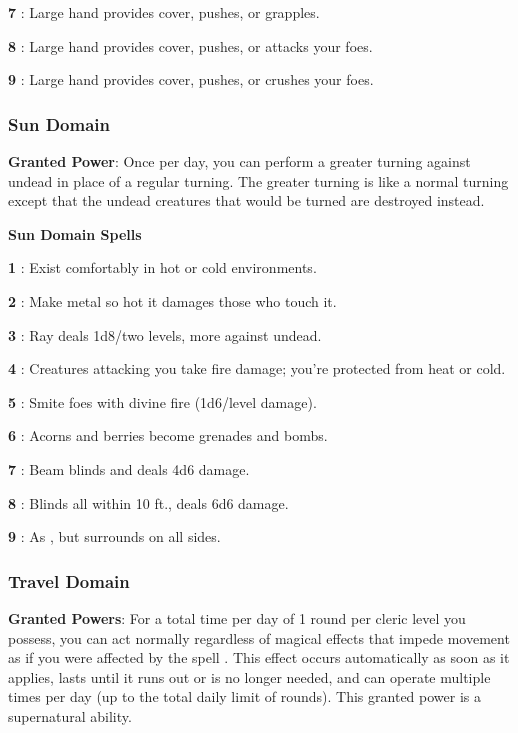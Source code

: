 \textbf{7} : Large hand provides cover, pushes, or grapples.

\textbf{8} : Large hand provides cover, pushes, or attacks your foes.

\textbf{9} : Large hand provides cover, pushes, or crushes your foes.

\subsubsection{Sun Domain}

\textbf{Granted Power}: Once per day, you can perform a greater turning against undead in place of a regular turning. The greater turning is like a normal turning except that the undead creatures that would be turned are destroyed instead.

\textbf{Sun Domain Spells}

\textbf{1} : Exist comfortably in hot or cold environments.

\textbf{2} : Make metal so hot it damages those who touch it.

\textbf{3} : Ray deals 1d8/two levels, more against undead.

\textbf{4} : Creatures attacking you take fire damage; you're protected from heat or cold.

\textbf{5} : Smite foes with divine fire (1d6/level damage).

\textbf{6} : Acorns and berries become grenades and bombs.

\textbf{7} : Beam blinds and deals 4d6 damage.

\textbf{8} : Blinds all within 10 ft., deals 6d6 damage.

\textbf{9} : As , but surrounds on all sides.

\subsubsection{Travel Domain}

\textbf{Granted Powers}: For a total time per day of 1 round per cleric level you possess, you can act normally regardless of magical effects that impede movement as if you were affected by the spell . This effect occurs automatically as soon as it applies, lasts until it runs out or is no longer needed, and can operate multiple times per day (up to the total daily limit of rounds). This granted power is a supernatural ability.

